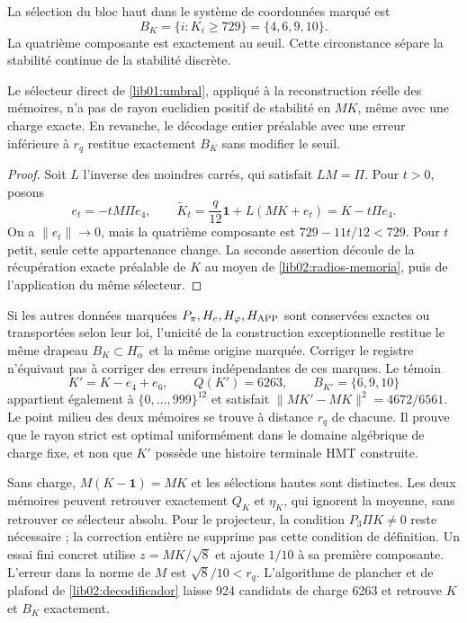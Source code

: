 La sélection du bloc haut dans le système de coordonnées marqué est
\begin{equation}
 B_K=\{i:K_i\geq729\}=\{4,6,9,10\}.
 \label{lib01:umbral}
\end{equation}
La quatrième composante est exactement au seuil. Cette circonstance
sépare la stabilité continue de la stabilité discrète.

\begin{proposition}
\label{lib01:umbral-estable}
Le sélecteur direct de \eqref{lib01:umbral}, appliqué à la reconstruction réelle des mémoires, n'a pas de rayon euclidien positif de stabilité en \(MK\), même avec une charge exacte. En revanche, le décodage entier préalable avec une erreur inférieure à \(r_q\) restitue exactement \(B_K\) sans modifier le seuil.
\end{proposition}
\begin{proof}
Soit \(L\) l’inverse des moindres carrés, qui satisfait
\(LM=\Pi\). Pour \(t>0\), posons
\[
 e_t=-tM\Pi e_4,
 \qquad \widetilde K_t=\frac q{12}\mathbf1+L(MK+e_t)
 =K-t\Pi e_4.
\]
On a \(\|e_t\|\to0\), mais la quatrième composante est
\(729-11t/12<729\). Pour \(t\) petit, seule cette appartenance change.
La seconde assertion découle de la récupération exacte préalable de \(K\)
au moyen de \cref{lib02:radios-memoria}, puis de l’application du même sélecteur.
\end{proof}

Si les autres données marquées \(P_\pi,H_e,H_\varphi,H_{\rm APP}\)
sont conservées exactes ou transportées selon leur loi, l’unicité de la
construction exceptionnelle restitue le même drapeau
\(B_K\subset H^-_\alpha\) et la même origine marquée. Corriger le
registre n’équivaut pas à corriger des erreurs indépendantes de ces marques.
Le témoin
\[
 K'=K-e_4+e_6,
 \qquad Q(K')=6263,\qquad B_{K'}=\{6,9,10\}
\]
appartient également à \(\{0,\ldots,999\}^{12}\) et satisfait \(\|MK'-MK\|^2=4672/6561\). Le point milieu des deux mémoires se trouve à distance \(r_q\) de chacune. Il prouve que le rayon strict est optimal uniformément dans le domaine algébrique de charge fixe, et non que \(K'\) possède une histoire terminale HMT construite.

Sans charge, \(M(K-\mathbf1)=MK\) et les sélections hautes sont distinctes.
Les deux mémoires peuvent retrouver exactement \(Q_K\) et \(\eta_K\),
qui ignorent la moyenne, sans retrouver ce sélecteur absolu. Pour le
projecteur, la condition \(P_3\Pi K\ne0\) reste nécessaire ;
la correction entière ne supprime pas cette condition de définition. Un essai
fini concret utilise \(z=MK/\sqrt8\) et ajoute \(1/10\) à sa première
composante. L’erreur dans la norme de \(M\) est \(\sqrt8/10<r_q\).
L’algorithme de plancher et de plafond de \cref{lib02:decodificador} laisse 924
candidats de charge 6263 et retrouve \(K\) et \(B_K\) exactement.

